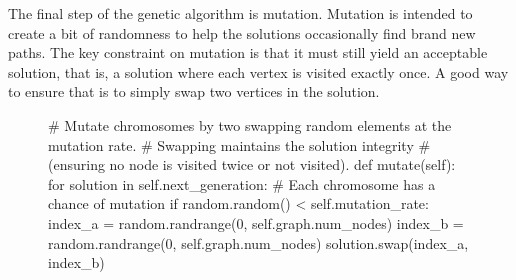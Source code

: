 The final step of the genetic algorithm is mutation. Mutation is intended to create a bit of randomness to help the solutions occasionally find brand new paths. The key constraint on mutation is that it must still yield an acceptable solution, that is, a solution where each vertex is visited exactly once. A good way to ensure that is to simply swap two vertices in the solution.

\begin{figure}[H]
\begin{python}
# Mutate chromosomes by two swapping random elements at the mutation rate.
# Swapping maintains the solution integrity 
# (ensuring no node is visited twice or not visited).
def mutate(self):
  for solution in self.next_generation:
  # Each chromosome has a chance of mutation
    if random.random() < self.mutation_rate: 
      index_a = random.randrange(0, self.graph.num_nodes)
      index_b = random.randrange(0, self.graph.num_nodes)
      solution.swap(index_a, index_b)
\end{python}
\end{figure}